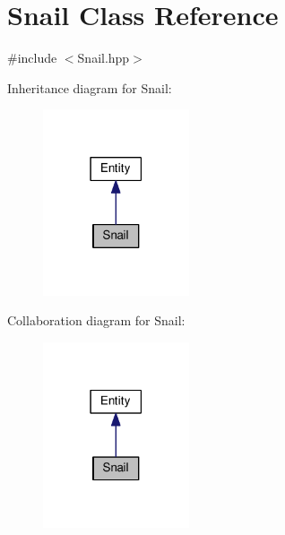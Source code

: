 \hypertarget{classSnail}{}\section{Snail Class Reference}
\label{classSnail}


{\ttfamily \#include $<$Snail.\+hpp$>$}



Inheritance diagram for Snail\+:\nopagebreak
\begin{figure}[H]
\begin{center}
\leavevmode
\includegraphics[width=122pt]{classSnail__inherit__graph}
\end{center}
\end{figure}


Collaboration diagram for Snail\+:\nopagebreak
\begin{figure}[H]
\begin{center}
\leavevmode
\includegraphics[width=122pt]{classSnail__coll__graph}
\end{center}
\end{figure}
